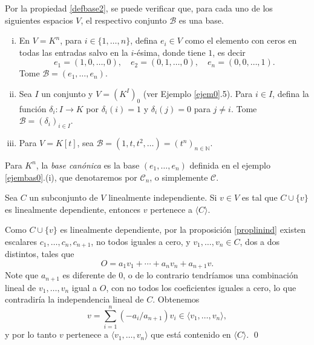 \begin{ejem}\label{ejembas0}
Por la propiedad \ref{defbase2}, se puede verificar que, para cada uno de los siguientes espacios $V$, el respectivo conjunto $\mathcal{B}$ es una base.
\begin{enumerate}[(i)]
\item En $V=K^n$, para $i\in\{1,\ldots, n\}$, defina $e_i\in V$ como el elemento con ceros en todas las entradas salvo en la $i$-\'esima, donde tiene $1$, es decir
$$e_1=(1,0,\ldots,0),\quad e_2=(0,1,\ldots,0),\quad e_n=(0,0,\ldots,1).$$
Tome $\mathcal{B}=(e_1,\ldots,e_n)$.
\item Sea $I$ un conjunto y $V=\left(K^I\right)_0$ (ver Ejemplo \ref{ejem0}.5). Para $i\in I$, defina la funci\'on $\delta_i: I\rightarrow K$ por $\delta_i(i)=1$ y $\delta_i(j)=0$ para $j\ne i$. Tome $\mathcal{B}=(\delta_i)_{i\in I}$. 
\item Para $V=K[t]$, sea $\mathcal{B}=(1,t,t^2,\ldots)=(t^n)_{n\in\mathbb{N}}$.
\end{enumerate}
\end{ejem}

\begin{nota}
Para $K^n$, la \emph{base can\'onica} es la base $(e_1,\ldots,e_n)$ definida en el ejemplo \ref{ejembas0}.(i), que denotaremos por $\mathcal{C}_n$, o simplemente $\mathcal{C}$.
\end{nota}

\begin{lema}\label{inddep}
Sea $C$ un subconjunto de $V$ linealmente independiente. Si $v\in V$ es tal que $C\cup\{v\}$ es linealmente dependiente, entonces $v$ pertenece a $\langle C\rangle$.
\end{lema}

\dem Como $C\cup\{v\}$ es linealmente dependiente, por la proposici\'on \ref{proplinind} existen escalares $c_1,\ldots,c_n,c_{n+1}$, no todos iguales a cero, y $v_1,\ldots,v_n\in C$, dos a dos distintos, tales que
\[
O=a_1v_1+\cdots+a_nv_n+a_{n+1}v.
\]
Note que $a_{n+1}$ es diferente de $0$, o de lo contrario tendr\'iamos una combinaci\'on lineal de $v_1,\ldots,v_n$ igual a $O$, con no todos los coeficientes iguales a cero, lo que contradiría la independencia lineal de $C$. Obtenemos
\[
v=\sum_{i=1}^n(-a_i/a_{n+1})v_i\in\langle v_1,\ldots,v_n\rangle,
\]
y por lo tanto $v$ pertenece a $\langle v_1,\ldots,v_n\rangle$ que está contenido en $\langle C\rangle$. \qed

